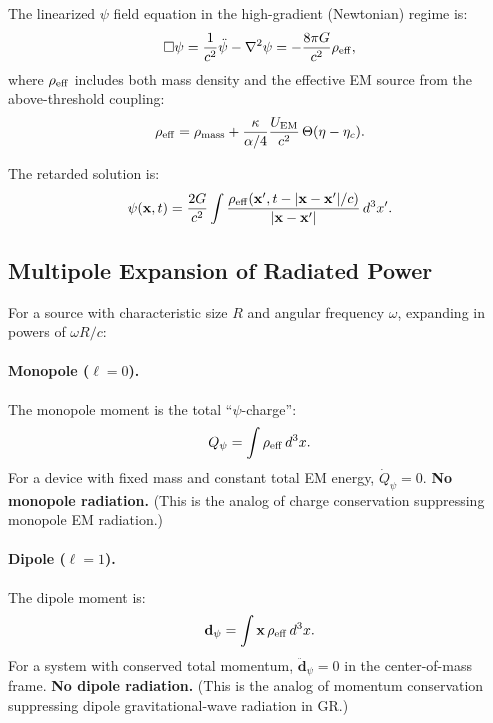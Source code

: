 \documentclass[11pt]{article}
\newcommand{\etac}{\eta_c}
\begin{document}
The linearized $\psi$ field equation in the high-gradient (Newtonian)
regime is:
\begin{equation}\label{eq:psi-wave}
\Box\psi = \frac{1}{c^2}\ddot{\psi} - \nabla^2\psi
= -\frac{8\pi G}{c^2}\rho_{\rm eff},
\end{equation}
where $\rho_{\rm eff}$ includes both mass density and the effective
EM source from the above-threshold coupling:
\begin{equation}
\rho_{\rm eff} = \rho_{\rm mass}
+ \frac{\kappa}{\alpha/4}\frac{U_{\rm EM}}{c^2}\,\Theta(\eta - \etac).
\end{equation}

The retarded solution is:
\begin{equation}
\psi(\mathbf{x},t) = \frac{2G}{c^2}\int\frac{\rho_{\rm eff}
(\mathbf{x}',t-|\mathbf{x}-\mathbf{x}'|/c)}{|\mathbf{x}-\mathbf{x}'|}
\,d^3x'.
\end{equation}

\subsection{Multipole Expansion of Radiated Power}

For a source with characteristic size $R$ and angular frequency $\omega$,
expanding in powers of $\omega R/c$:

\paragraph{Monopole ($\ell = 0$).}
The monopole moment is the total ``$\psi$-charge'':
\begin{equation}
Q_\psi = \int \rho_{\rm eff}\,d^3x.
\end{equation}
For a device with fixed mass and constant total EM energy,
$\dot{Q}_\psi = 0$. \textbf{No monopole radiation.} (This is the
analog of charge conservation suppressing monopole EM radiation.)

\paragraph{Dipole ($\ell = 1$).}
The dipole moment is:
\begin{equation}
\mathbf{d}_\psi = \int \mathbf{x}\,\rho_{\rm eff}\,d^3x.
\end{equation}
For a system with conserved total momentum, $\ddot{\mathbf{d}}_\psi = 0$
in the center-of-mass frame. \textbf{No dipole radiation.} (This is the
analog of momentum conservation suppressing dipole gravitational-wave
radiation in GR.)
\end{document}
